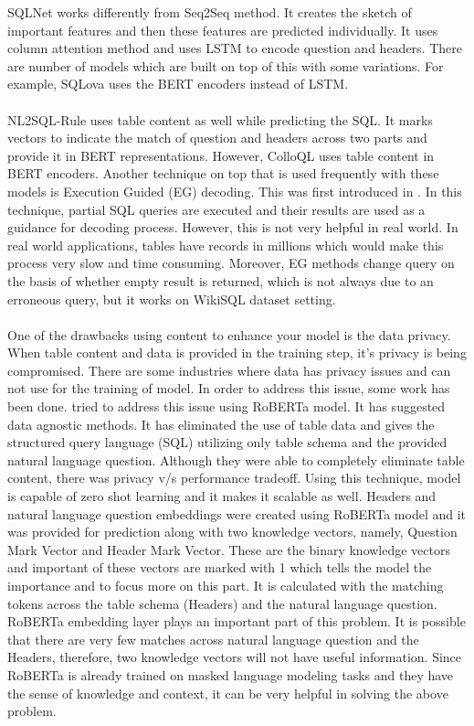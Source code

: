 \documentclass[12pt]{article}
\begin{document}
SQLNet \cite{xu2017sqlnet} works differently from Seq2Seq method. It creates the sketch of important features and then these features are predicted individually. It uses column attention method and uses LSTM to encode question and headers. There are number of models which are built on top of this with some variations. For example, SQLova \cite{hwang2019comprehensive} uses the BERT encoders instead of LSTM. 
\\
\\
NL2SQL-Rule \cite{guo2019content} uses table content as well while predicting the SQL. It marks vectors to indicate the match of question and headers across two parts and provide it in BERT representations. However, ColloQL uses table content in BERT encoders. Another technique on top that is used frequently with these models is Execution Guided (EG) decoding. This was first introduced in \cite{wang2018robust}. In this technique, partial SQL queries are executed and their results are used as a guidance for decoding process. However, this is not very helpful in real world. In real world applications, tables have records in millions which would make this process very slow and time consuming. Moreover, EG methods change query on the basis of whether empty result is returned, which is not always due to an erroneous query, but it works on WikiSQL dataset setting. \\
\\One of the drawbacks using content to enhance your model is the data privacy. When table content and data is provided in the training step, it's privacy is being compromised. There are some industries where data has privacy issues and can not use for the training of model. In order to address this issue, some work has been done. \cite{pal2020data} tried to address this issue using RoBERTa model. It has suggested data agnostic methods. It has eliminated the use of table data and gives the structured query language (SQL) utilizing only table schema and the provided natural language question. Although they were able to completely eliminate table content, there was privacy v/s performance tradeoff. Using this technique, model is capable of zero shot learning and it makes it scalable as well. Headers and natural language question embeddings were created using RoBERTa model and it was provided for prediction along with two knowledge vectors, namely, Question Mark Vector and Header Mark Vector. These are the binary knowledge vectors and important of these vectors are marked with 1 which tells the model the importance and to focus more on this part. It is calculated with the matching tokens across the table schema (Headers) and the natural language question. RoBERTa embedding layer plays an important part of this problem. It is possible that there are very few matches across natural language question and the Headers, therefore, two knowledge vectors will not have useful information. Since RoBERTa is already trained on masked language modeling tasks and they have the sense of knowledge and context, it can be very helpful in solving the above problem. \\
\end{document}
